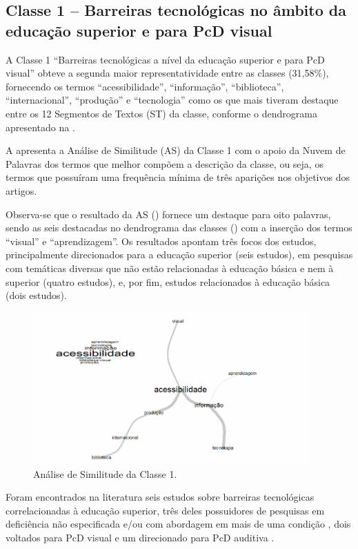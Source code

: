 \documentclass{textolivre}
\begin{document}
\subsection{Classe 1 – Barreiras tecnológicas no âmbito da educação superior e para PcD visual}
A Classe 1 “Barreiras tecnológicas a nível da educação superior e para PcD visual” obteve a segunda maior representatividade entre as classes (31,58\%), fornecendo os termos “acessibilidade”, “informação”, “biblioteca”, “internacional”, “produção” e “tecnologia” como os que mais tiveram destaque entre os 12 Segmentos de Textos (ST) da classe, conforme o dendrograma apresentado na .

A  apresenta a Análise de Similitude (AS) da Classe 1 com o apoio da Nuvem de Palavras dos termos que melhor compõem a descrição da classe, ou seja, os termos que possuíram uma frequência mínima de três aparições nos objetivos dos artigos.

Observa-se que o resultado da AS () fornece um destaque para oito palavras, sendo as seis destacadas no dendrograma das classes () com a inserção dos termos “visual” e “aprendizagem”. Os resultados apontam três focos dos estudos, principalmente direcionados para a educação superior (seis estudos), em pesquisas com temáticas diversas que não estão relacionadas à educação básica e nem à superior (quatro estudos), e, por fim, estudos relacionados à educação básica (dois estudos).

\begin{figure}[htbp]
 \centering
 \includegraphics[width=0.95\textwidth]{fig3-32563.png}
 \caption{Análise de Similitude da Classe 1.}
 \label{fig3}
\end{figure}

Foram encontrados na literatura seis estudos sobre barreiras tecnológicas correlacionadas à educação superior, três deles possuidores de pesquisas em deficiência não especificada e/ou com abordagem em mais de uma condição \cite{silva+gonzalezgil2017, souza2019, vianna2017}, dois voltados para PcD visual \cite{fialho2012, novelli2014} e um direcionado para PcD auditiva \cite{pivetta2014}.
\end{document}
